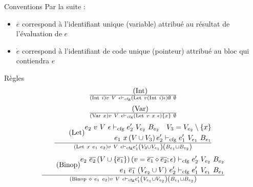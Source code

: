 \documentclass{beamer}
\begin{document}
\begin{frame}{Conventions}
    Par la suite :
    \begin{itemize}
        \item $\overline{e}$ correspond à l'identifiant unique (variable) attribué au résultat de l'évaluation de $e$
        \item $\dot{e}$ correspond à l'identifiant de code unique (pointeur)  attribué au bloc qui contiendra $e$
    \end{itemize}
\end{frame}

\begin{frame}{Règles}
    \begin{gather}
        \tag{Int}
        \over \left( \text{Int} ~ i \right) v ~ V ~ \epsilon \vdash_{\text{cfg}} \left( \text{Let} ~ v \left( \text{Int} ~ i \right) \epsilon \right) \emptyset ~ \emptyset
     \end{gather}
     \begin{gather}
        \tag{Var}
        \label{Var}
        \over \left( \text{Var} ~ x \right) v ~ V ~ \epsilon \vdash_{\text{cfg}} \left( \text{Let} ~ v ~ x ~ \epsilon \right) \lbrace x \rbrace ~ \emptyset
     \end{gather}
     \begin{gather}
        \tag{Let}
        \begin{split}
           e_2 ~ v ~ V ~ \epsilon \vdash_{\text{cfg}} e_2' ~ V_{e_2} ~ B_{e_2} \quad V_3 = V_{e_2} \setminus \lbrace x \rbrace \\
           e_1 ~ x \left( V \cup V_3 \right) e_2' \vdash_{\text{cfg}} e_1' ~ V_{e_1} ~ B_{e_1}
        \end{split}
        \over \left( \text{Let} ~ x ~ e_1 ~ e_2 \right) v ~ V ~ \epsilon \vdash_{\text{cfg}} e_1' \left( V_3 \cup V_{e_1} \right) \left( B_{e_1} \sqcup B_{e_2} \right)
     \end{gather}
     \begin{gather}
     \tag{Binop}
        \begin{split}
           e_2 ~ \overline{e_2} \left( V \cup \lbrace \overline{e_1} \rbrace \right) (v = \overline{e_1} \diamond \overline{e_2}; \epsilon) &\vdash_{\text{cfg}} e_2' ~ V_{e_2} ~ B_{e_2} \\
           e_1 ~ \overline{e_1} ~ (V_{e_2} \cup V) ~ e_2' &\vdash_{\text{cfg}} e_1' ~ V_{e_1} ~ B_{e_1}
        \end{split}
        \over \left( \text{Binop} ~ \diamond ~ e_1 ~ e_2 \right) v ~ V ~ \epsilon \vdash_{\text{cfg}} e_1' \left( V_{e_1} \cup V_{e_2} \right) \left( B_{e_1} \sqcup B_{e_2} \right)

\end{gather}
\end{frame}
\end{document}
